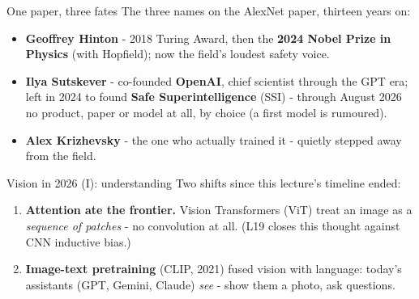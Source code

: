 \documentclass[aspectratio=169]{beamer}
\begin{document}
\begin{frame}{One paper, three fates}
  The three names on the AlexNet paper, thirteen years on:
  \vskip 8pt
  \begin{itemize}
    \item \textbf{Geoffrey Hinton} - 2018 Turing Award, then the \textbf{2024 Nobel
      Prize in Physics} (with Hopfield); now the field's loudest safety voice.
    \item \textbf{Ilya Sutskever} - co-founded \textbf{OpenAI}, chief scientist
      through the GPT era; left in 2024 to found \textbf{Safe Superintelligence}
      (SSI) - through August 2026 no product, paper or model at all, by choice (a first
      model is rumoured).
    \item \textbf{Alex Krizhevsky} - the one who actually trained it - quietly
      stepped away from the field.
  \end{itemize}
  \vskip 10pt
\end{frame}

\begin{frame}{Vision in 2026 (I): understanding}
  Two shifts since this lecture's timeline ended:
  \vskip 6pt
  \begin{enumerate}
    \item \textbf{Attention ate the frontier.} Vision Transformers (ViT) treat an
      image as a \emph{sequence of patches} - no convolution at all. (L19 closes
      this thought against CNN inductive bias.)
    \item \textbf{Image-text pretraining} (CLIP, 2021) fused vision with language:
      today's assistants (GPT, Gemini, Claude) \emph{see} - show them a photo, ask
      questions.
  \end{enumerate}
  \vskip 8pt
  \vskip 4pt
  \begin{center}
    \href{https://claude.ai}{}
  \end{center}
\end{frame}
\end{document}
